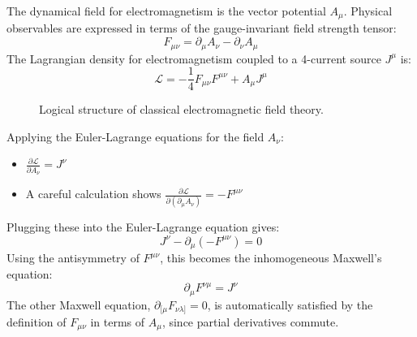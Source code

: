 \documentclass[11pt, a4paper]{report}
\begin{document}
The dynamical field for electromagnetism is the vector potential $A_\mu$. Physical observables are expressed in terms of the gauge-invariant field strength tensor:
\begin{equation}
    F_{\mu\nu} = \partial_\mu A_\nu - \partial_\nu A_\mu
\end{equation}
The Lagrangian density for electromagnetism coupled to a 4-current source $J^\mu$ is:
\begin{equation}
    \mathcal{L} = -\frac{1}{4}F_{\mu\nu}F^{\mu\nu} + A_\mu J^\mu
\end{equation}
\begin{figure}[h]
\centering
{}
\caption{Logical structure of classical electromagnetic field theory.}
\end{figure}

Applying the Euler-Lagrange equations for the field $A_\nu$:
\begin{itemize}
    \item $\frac{\partial\mathcal{L}}{\partial A_\nu} = J^\nu$
    \item A careful calculation shows $\frac{\partial\mathcal{L}}{\partial(\partial_\mu A_\nu)} = -F^{\mu\nu}$
\end{itemize}
Plugging these into the Euler-Lagrange equation gives:
\[
    J^\nu - \partial_\mu(-F^{\mu\nu}) = 0
\]
Using the antisymmetry of $F^{\mu\nu}$, this becomes the inhomogeneous Maxwell's equation:
\begin{equation}
    \partial_\mu F^{\nu\mu} = J^\nu
\end{equation}
The other Maxwell equation, $\partial_{[\mu}F_{\nu\lambda]}=0$, is automatically satisfied by the definition of $F_{\mu\nu}$ in terms of $A_\mu$, since partial derivatives commute.
\end{document}

